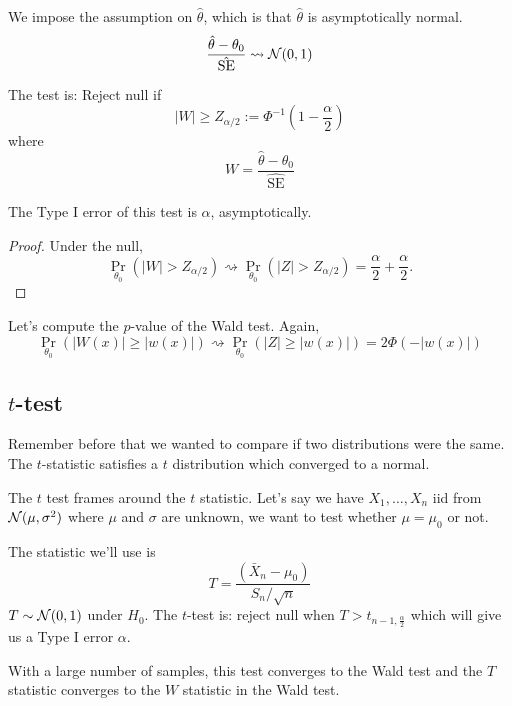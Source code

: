 We impose the assumption on $\hat{\theta}$, which is that $\hat{\theta}$ is asymptotically normal.
\[\frac{\hat{\theta} - \theta_0}{\hat{\mathrm{SE}}}\rightsquigarrow \mathcal N(0, 1)\]

The test is: Reject null if
\[|W|\geq Z_{\alpha/2} := \Phi^{-1}\left( 1 - \frac{\alpha}{2} \right)\]
where
\[W = \frac{\hat{\theta} - \theta_0}{\hat{\mathrm{SE}}}\]

\begin{lemma}
    The Type I error of this test is $\alpha$, asymptotically.
\end{lemma}
\begin{proof}
    Under the null,
    \[\Pr_{\theta_0}\left( |W| > Z_{\alpha/2} \right) \rightsquigarrow \Pr_{\theta_0}\left( |Z| > Z_{\alpha/2} \right) = \frac{\alpha}{2} + \frac{\alpha}{2}.\]
\end{proof}

Let's compute the $p$-value of the Wald test. Again,
\[\Pr_{\theta_0}(|W(x)| \geq |w(x)|)\rightsquigarrow \Pr_{\theta_0}(|Z| \geq |w(x)|) = 2\Phi(-|w(x)|)\]


\subsection{\texorpdfstring{$t$}{t}-test}
Remember before that we wanted to compare if two distributions were the same. The $t$-statistic satisfies a $t$ distribution which converged to a normal.

The $t$ test frames around the $t$ statistic. Let's say we have $X_1, \dots, X_n$ iid from $\mathcal N(\mu, \sigma^2)$ where $\mu$ and $\sigma$ are unknown, we want to test whether $\mu = \mu_0$ or not.

The statistic we'll use is
\[T = \frac{(\bar{X}_n - \mu_0)}{S_n/\sqrt{n}}\]
$T\sim \mathcal N(0, 1)$ under $H_0$. The $t$-test is: reject null when $T > t_{n-1, \frac{\alpha}{2}}$ which will give us a Type I error $\alpha$.

With a large number of samples, this test converges to the Wald test and the $T$ statistic converges to the $W$ statistic in the Wald test.